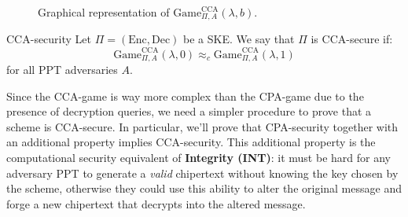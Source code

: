 \documentclass[a4paper, 12pt]{report}
\begin{document}
\begin{figure}[H]

        \caption{Graphical representation of $\mathrm{Game}_{\Pi, A}^{\text{CCA}}(\lambda, b)$.}
    \end{figure}

    \begin{frameddefn}{CCA-security}
        Let $\Pi = (\mathrm{Enc}, \mathrm{Dec})$ be a SKE. We say that $\Pi$ is CCA-secure if:
        \[\mathrm{Game}_{\Pi, A}^{\text{CCA}}(\lambda, 0) \approx_c \mathrm{Game}_{\Pi, A}^{\text{CCA}}(\lambda, 1)\]
        for all PPT adversaries $A$.
    \end{frameddefn}

    Since the CCA-game is way more complex than the CPA-game due to the presence of decryption queries, we need a simpler procedure to prove that a scheme is CCA-secure. In particular, we'll prove that CPA-security together with an additional property implies CCA-security. This additional property is the computational security equivalent of \textbf{Integrity (INT)}: it must be hard for any adversary PPT to generate a \textit{valid} chipertext without knowing the key chosen by the scheme, otherwise they could use this ability to alter the original message and forge a new chipertext that decrypts into the altered message.
\end{document}
